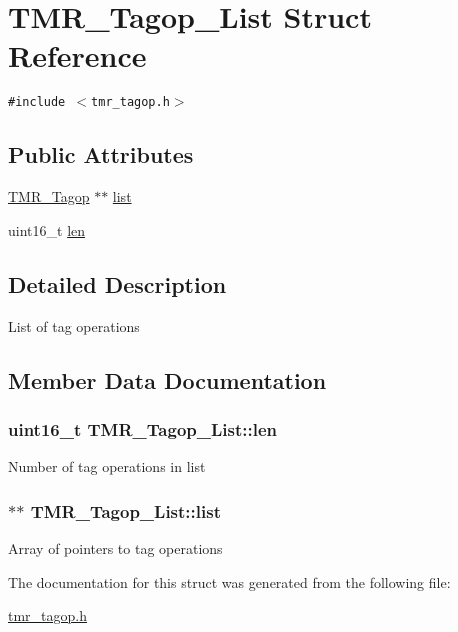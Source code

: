 \hypertarget{struct_t_m_r___tagop___list}{
\section{TMR\_\-Tagop\_\-List Struct Reference}
\label{struct_t_m_r___tagop___list}
}
{\tt \#include $<$tmr\_\-tagop.h$>$}

\subsection*{Public Attributes}
\begin{CompactItemize}
\item 
\hyperlink{struct_t_m_r___tagop}{TMR\_\-Tagop} $\ast$$\ast$ \hyperlink{struct_t_m_r___tagop___list_c254eb12709b703b361692e64c5264a3}{list}
\item 
uint16\_\-t \hyperlink{struct_t_m_r___tagop___list_b1238b8844a98baa51d48371af97b1ae}{len}
\end{CompactItemize}


\subsection{Detailed Description}
List of tag operations 

\subsection{Member Data Documentation}
\hypertarget{struct_t_m_r___tagop___list_b1238b8844a98baa51d48371af97b1ae}{
\subsubsection[{len}]{\setlength{\rightskip}{0pt plus 5cm}uint16\_\-t {\bf TMR\_\-Tagop\_\-List::len}}}
\label{struct_t_m_r___tagop___list_b1238b8844a98baa51d48371af97b1ae}


Number of tag operations in list \hypertarget{struct_t_m_r___tagop___list_c254eb12709b703b361692e64c5264a3}{
\subsubsection[{list}]{$\ast$$\ast$ {\bf TMR\_\-Tagop\_\-List::list}}}
\label{struct_t_m_r___tagop___list_c254eb12709b703b361692e64c5264a3}


Array of pointers to tag operations 

The documentation for this struct was generated from the following file:\begin{CompactItemize}
\item 
\hyperlink{tmr__tagop_8h}{tmr\_\-tagop.h}\end{CompactItemize}
